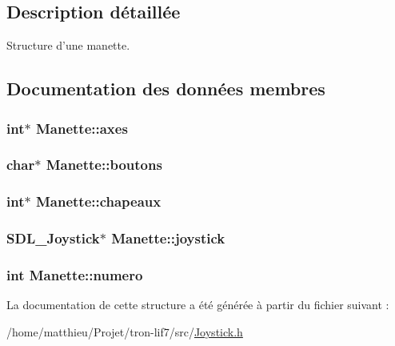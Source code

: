 \subsection{Description détaillée}
Structure d'une manette. 

\subsection{Documentation des données membres}
\hypertarget{structManette_abc9f5234f07d79af9735b501956a8d60}{
\subsubsection[{axes}]{\setlength{\rightskip}{0pt plus 5cm}int$\ast$ Manette\-::axes}}\label{structManette_abc9f5234f07d79af9735b501956a8d60}
\hypertarget{structManette_a07814b5f1ebd865b6e15d2094cf5d671}{
\subsubsection[{boutons}]{\setlength{\rightskip}{0pt plus 5cm}char$\ast$ Manette\-::boutons}}\label{structManette_a07814b5f1ebd865b6e15d2094cf5d671}
\hypertarget{structManette_ab12d322b8fadc5e42218b065e7f86d65}{
\subsubsection[{chapeaux}]{\setlength{\rightskip}{0pt plus 5cm}int$\ast$ Manette\-::chapeaux}}\label{structManette_ab12d322b8fadc5e42218b065e7f86d65}
\hypertarget{structManette_ad11c45cf2d1afa059fae52ab61a177d8}{
\subsubsection[{joystick}]{\setlength{\rightskip}{0pt plus 5cm}S\-D\-L\-\_\-\-Joystick$\ast$ Manette\-::joystick}}\label{structManette_ad11c45cf2d1afa059fae52ab61a177d8}
\hypertarget{structManette_aedc72637b122d8d34ce23f4cf98be10b}{
\subsubsection[{numero}]{\setlength{\rightskip}{0pt plus 5cm}int Manette\-::numero}}\label{structManette_aedc72637b122d8d34ce23f4cf98be10b}


La documentation de cette structure a été générée à partir du fichier suivant \-:\begin{DoxyCompactItemize}
\item 
/home/matthieu/\-Projet/tron-\/lif7/src/\hyperlink{Joystick_8h}{Joystick.\-h}\end{DoxyCompactItemize}
